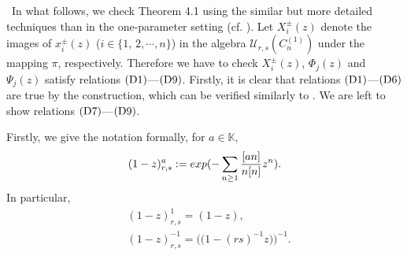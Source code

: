 \documentclass{amsproc}
\theoremstyle{remark}
\numberwithin{equation}{section}
\begin{document}
 \ In what follows,
we check Theorem 4.1 using the similar but more detailed techniques than in the one-parameter setting (cf. \cite{JKM2}).
Let $X_i^{\pm}(z)$ denote the images of $x_i^{\pm}(z)$ ($i\in \{1,\,2,\cdots, n\}$)
in the algebra ${\mathcal U}_{r,s}(C_n^{(1)})$ under the mapping $\pi$, respectively.
Therefore we have to check $X_i^{\pm}(z)$, $\Phi_j(z)$ and $\Psi_j(z)$ satisfy
relations $({\rm D}1)$---$({\rm D}9)$. Firstly, it is clear that relations $({\rm D}1)$---$({\rm D}6)$
are true by the construction, which can be verified similarly to \cite{HZ}. We are left to show relations $({\rm D}7)$---$({\rm D}9)$.

Firstly, we give the notation formally, for $a \in \mathbb{K}$,
\begin{eqnarray}{\label{n:1}
(1-z)_{r,s}^{a}:=exp(-\sum_{{n\geq 1}}\frac{[an]}{n[n]}z^{n}).}
\end{eqnarray}
In particular, \begin{eqnarray}
&(1-z)_{r,s}^{1}=(1-z),\\
&(1-z)_{r,s}^{-1}=\Big(\big(1-(rs)^{-1}z\big)\Big)^{-1}.
\end{eqnarray}
\end{document}
